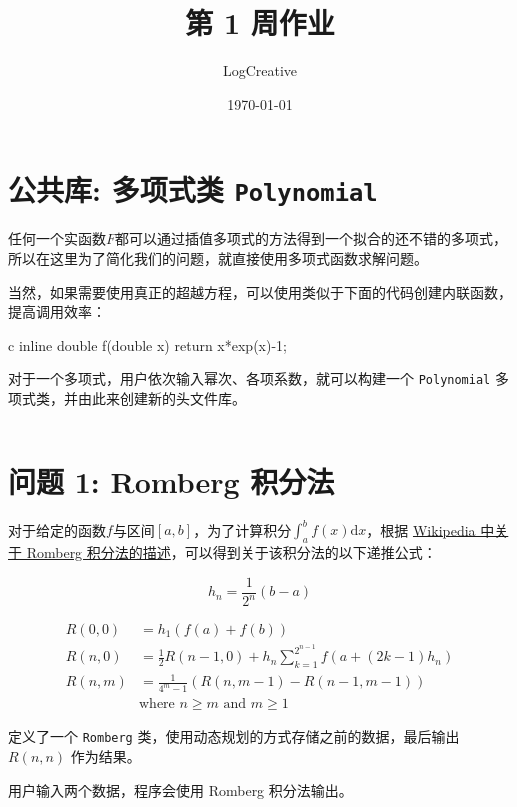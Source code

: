 \documentclass[12pt,a4paper]{article}
\begin{document}
\title{第 1 周作业}
\author{LogCreative}
\date{\today}

\maketitle

\section{公共库: 多项式类 \texttt{Polynomial}}

任何一个实函数$F$都可以通过插值多项式的方法得到一个拟合的还不错的多项式，所以在这里为了简化我们的问题，就直接使用多项式函数求解问题。

当然，如果需要使用真正的超越方程，可以使用类似于下面的代码创建内联函数，提高调用效率：
\begin{code}{c}
    inline double f(double x){ return x*exp(x)-1; }
\end{code}

对于一个多项式，用户依次输入幂次、各项系数，就可以构建一个 \texttt{Polynomial} 多项式类，并由此来创建新的头文件库。

\inputminted[]{cpp}{code/polynomial.h}

\section{问题 1: Romberg 积分法}

对于给定的函数$f$与区间$[a,b]$，为了计算积分$\int_a^b f(x)\text{d}x$，根据 \href{https://en.wikipedia.org/wiki/Romberg\%27s_method}{Wikipedia 中关于 Romberg 积分法的描述}，可以得到关于该积分法的以下递推公式：

$$h_n=\frac{1}{2^n}(b-a)$$

\begin{align*}
    R(0,0) &= h_1 (f(a)+f(b)) \\ 
    R(n,0) &= \frac{1}{2}R(n-1,0) + h_n\sum_{k=1}^{2^{n-1}}f(a+(2k-1)h_n)\\
    R(n,m) &=\frac{1}{4^m -1}\left( R(n,m-1) - R(n-1,m-1) \right) \\ 
    &\text{where } n\geq m \text{ and } m\geq 1
\end{align*}


定义了一个 \texttt{Romberg} 类，使用动态规划的方式存储之前的数据，最后输出 $R(n,n)$ 作为结果。

用户输入两个数据，程序会使用 Romberg 积分法输出。
\end{document}
